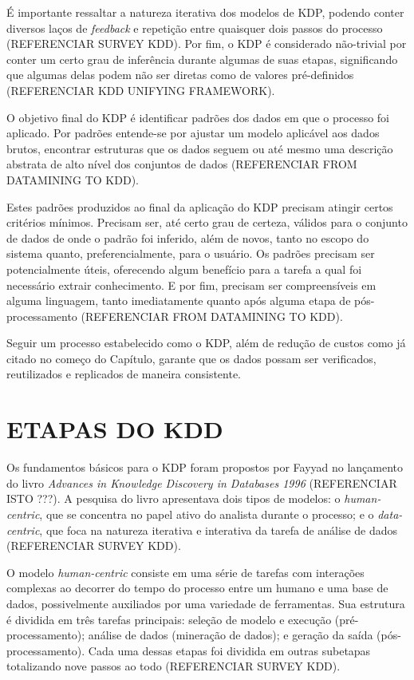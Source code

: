 É importante ressaltar a natureza iterativa dos modelos de KDP, podendo conter diversos laços de \textit{feedback} e repetição entre quaisquer dois passos do processo (REFERENCIAR SURVEY KDD). Por fim, o KDP é considerado não-trivial por conter um certo grau de inferência durante algumas de suas etapas, significando que algumas delas podem não ser diretas como de valores pré-definidos (REFERENCIAR KDD UNIFYING FRAMEWORK).

O objetivo final do KDP é identificar padrões dos dados em que o processo foi aplicado. Por padrões entende-se por ajustar um modelo aplicável aos dados brutos, encontrar estruturas que os dados seguem ou até mesmo uma descrição abstrata de alto nível dos conjuntos de dados (REFERENCIAR FROM DATAMINING TO KDD).

Estes padrões produzidos ao final da aplicação do KDP precisam atingir certos critérios mínimos. Precisam ser, até certo grau de certeza, válidos para o conjunto de dados de onde o padrão foi inferido, além de novos, tanto no escopo do sistema quanto, preferencialmente, para o usuário. Os padrões precisam ser potencialmente úteis, oferecendo algum benefício para a tarefa a qual foi necessário extrair conhecimento. E por fim, precisam ser compreensíveis em alguma linguagem, tanto imediatamente quanto após alguma etapa de pós-processamento (REFERENCIAR FROM DATAMINING TO KDD).

Seguir um processo estabelecido como o KDP, além de redução de custos como já citado no começo do Capítulo, garante que os dados possam ser verificados, reutilizados e replicados de maneira consistente.

\section{ETAPAS DO KDD}
\label{sec:etapasKDD}

Os fundamentos básicos para o KDP foram propostos por Fayyad no lançamento do livro \textit{Advances in Knowledge Discovery in Databases 1996} (REFERENCIAR ISTO ???). A pesquisa do livro apresentava dois tipos de modelos: o \textit{human-centric}, que se concentra no papel ativo do analista durante o processo; e o \textit{data-centric}, que foca na natureza iterativa e interativa da tarefa de análise de dados (REFERENCIAR SURVEY KDD).

O modelo \textit{human-centric} consiste em uma série de tarefas com interações complexas ao decorrer do tempo do processo entre um humano e uma base de dados, possivelmente auxiliados por uma variedade de ferramentas. Sua estrutura é dividida em três tarefas principais: seleção de modelo e execução (pré-processamento); análise de dados (mineração de dados); e geração da saída (pós-processamento). Cada uma dessas etapas foi dividida em outras subetapas totalizando nove passos ao todo (REFERENCIAR SURVEY KDD).

